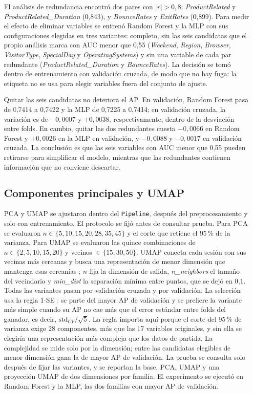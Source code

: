 \documentclass[journal]{IEEEtran}
\begin{document}
El análisis de redundancia encontró dos pares con $|r|>0{,}8$: \textit{ProductRelated} y
\textit{ProductRelated\_Duration} (0{,}843), y \textit{BounceRates} y \textit{ExitRates}
(0{,}899). Para medir el efecto de eliminar variables se entrenó Random Forest y la MLP
con sus configuraciones elegidas en tres variantes: completo, sin las seis candidatas que
el propio análisis marca con AUC menor que 0,55 (\textit{Weekend}, \textit{Region},
\textit{Browser}, \textit{VisitorType}, \textit{SpecialDay} y \textit{OperatingSystems})
y sin una variable de cada par redundante
(\textit{ProductRelated\_Duration} y \textit{BounceRates}). La decisión se tomó dentro de
entrenamiento con validación cruzada, de modo que no hay fuga: la etiqueta no se usa para
elegir variables fuera del conjunto de ajuste.

Quitar las seis candidatas no deteriora el AP. En validación, Random Forest pasa de
0{,}7414 a 0{,}7422 y la MLP de 0{,}7225 a 0{,}7414; en validación cruzada, la variación
es de $-0{,}0007$ y $+0{,}0038$, respectivamente, dentro de la desviación entre folds. En
cambio, quitar las dos redundantes cuesta $-0{,}0066$ en Random Forest y $+0{,}0026$ en la
MLP en validación, y $-0{,}0088$ y $-0{,}0017$ en validación cruzada. La conclusión es que
las seis variables con AUC menor que 0,55 pueden retirarse para simplificar el modelo,
mientras que las redundantes contienen información que no conviene descartar.

\subsection{Componentes principales y UMAP}

PCA y UMAP se ajustaron dentro del \texttt{Pipeline}, después del preprocesamiento y solo
con entrenamiento. El protocolo se fijó antes de consultar prueba. Para PCA se evaluaron
$n\in\{5,10,15,20,28,35,45\}$ y el corte que retiene el 95\,\% de la varianza. Para UMAP se
evaluaron las quince combinaciones de $n\in\{2,5,10,15,20\}$ y vecinos
$\in\{15,30,50\}$. UMAP conecta cada sesión con sus vecinas más cercanas y busca una representación de
menor dimensión que mantenga esas cercanías \cite{ref_umap}; $n$ fija la
dimensión de salida, \textit{n\_neighbors} el tamaño del vecindario y \textit{min\_dist}
la separación mínima entre puntos, que se dejó en 0,1. Todas las variantes pasan por validación cruzada y por validación. La
selección usa la regla 1-SE \cite{ref_chen}: se parte del mayor AP de validación y se
prefiere la variante más simple cuando su AP no cae más que el error estándar entre folds
del ganador, es decir, $\text{std}_{CV}/\sqrt{5}$. La regla importa aquí porque el corte
del 95\,\% de varianza exige 28 componentes, más que las 17 variables originales, y sin
ella se elegiría una representación más compleja que los datos de partida. La complejidad se mide solo por la dimensión; entre las
candidatas elegibles de menor dimensión gana la de mayor AP de validación. La prueba se
consulta solo después de fijar las variantes, y se reportan la base, PCA, UMAP y una
proyección UMAP de dos dimensiones por familia. El experimento se ejecutó en Random Forest y
la MLP, las dos familias con mayor AP de validación.
\end{document}
